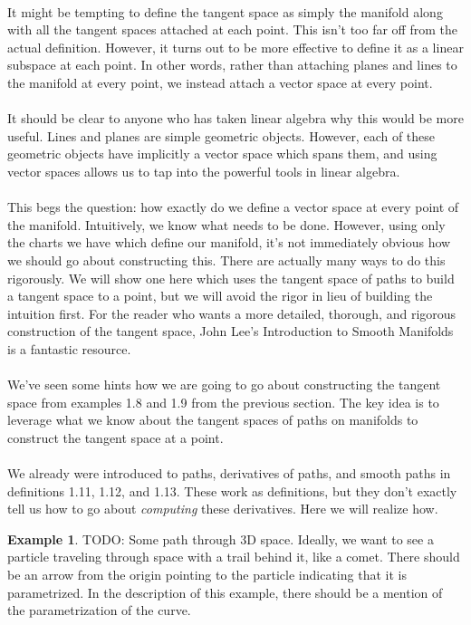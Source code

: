 \documentclass[]{article}
\newcommand\<{\ensuremath{\left\langle}}
\renewcommand\>{\ensuremath{\right\rangle}}
\theoremstyle{definition}
\theoremstyle{definition}
\newtheorem{example}{Example}[section]
\begin{document}
	\\
	It might be tempting to define the tangent space as simply the manifold along with all the tangent spaces attached at each point. This isn't too far off from the actual definition. However, it turns out to be more effective to define it as a linear subspace at each point. In other words, rather than attaching planes and lines to the manifold at every point, we instead attach a vector space at every point.\\
	\\
	It should be clear to anyone who has taken linear algebra why this would be more useful. Lines and planes are simple geometric objects. However, each of these geometric objects have implicitly a vector space which spans them, and using vector spaces allows us to tap into the powerful tools in linear algebra.\\
	\\
	This begs the question: how exactly do we define a vector space at every point of the manifold. Intuitively, we know what needs to be done. However, using only the charts we have which define our manifold, it's not immediately obvious how we should go about constructing this. There are actually many ways to do this rigorously. We will show one here which uses the tangent space of paths to build a tangent space to a point, but we will avoid the rigor in lieu of building the intuition first. For the reader who wants a more detailed, thorough, and rigorous construction of the tangent space, John Lee's Introduction to Smooth Manifolds is a fantastic resource.\\
	\\
	We've seen some hints how we are going to go about constructing the tangent space from examples 1.8 and 1.9 from the previous section. The key idea is to leverage what we know about the tangent spaces of paths on manifolds to construct the tangent space at a point.\\
	\\
	We already were introduced to paths, derivatives of paths, and smooth paths in definitions 1.11, 1.12, and 1.13. These work as definitions, but they don't exactly tell us how to go about \textit{computing} these derivatives. Here we will realize how.
	\\
	\begin{example}
		TODO: Some path through 3D space. Ideally, we want to see a particle traveling through space with a trail behind it, like a comet. There should be an arrow from the origin pointing to the particle indicating that it is parametrized. In the description of this example, there should be a mention of the parametrization of the curve.
	\end{example}
\end{document}
